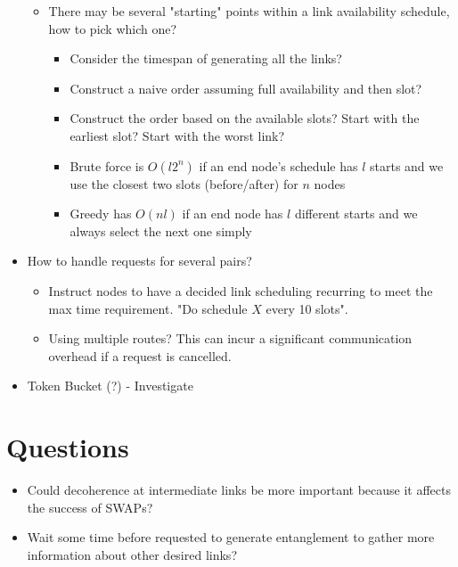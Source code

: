 \documentclass{article}
\begin{document}
\begin{itemize}
\begin{itemize}
\begin{itemize}
        \end{itemize}
        \item There may be several "starting" points within a link availability schedule, how to pick which one?
        \begin{itemize}
            \item Consider the timespan of generating all the links?
            \item Construct a naive order assuming full availability and then slot?
            \item Construct the order based on the available slots?  Start with the earliest slot?  Start with the worst link?
            \item Brute force is $O(l2^n)$ if an end node's schedule has $l$ starts and we use the closest two slots (before/after) for $n$ nodes
            \item Greedy has $O(nl)$ if an end node has $l$ different starts and we always select the next one simply
        \end{itemize}
    \end{itemize}
    \item How to handle requests for several pairs?
    \begin{itemize}
        \item Instruct nodes to have a decided link scheduling recurring to meet the max time requirement.  "Do schedule $X$ every 10 slots".
        \item Using multiple routes?  This can incur a significant communication overhead if a request is cancelled.
    \end{itemize}
\end{itemize}

\begin{itemize}
    \item Token Bucket (?) - Investigate
\end{itemize}

\section{Questions}
\begin{itemize}
    \item Could decoherence at intermediate links be more important because it affects the success of SWAPs?
    \item Wait some time before requested to generate entanglement to gather more information about other desired links?
\end{itemize}
\end{document}

